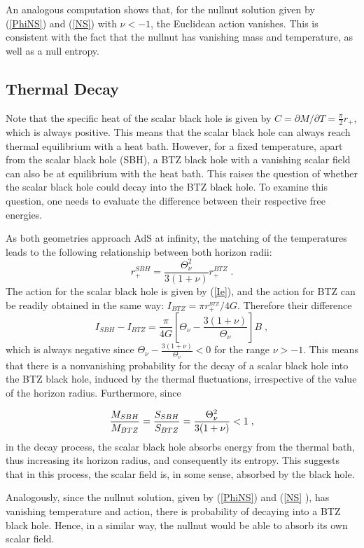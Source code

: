 \documentclass[a4paper,12pt]{article}
\begin{document}
An analogous computation shows that, for the nullnut solution given by (\ref{PhiNS})
and (\ref{NS})  with $\nu <-1$, the Euclidean action vanishes. This
is consistent with the fact that the nullnut has vanishing mass and
temperature, as well as a null entropy.

\subsection{Thermal Decay}

Note that the specific heat of the scalar black hole is given by $C=\partial
M/\partial T=\frac{\pi }{2}r_{+}$, which is always positive. This means that
the scalar black hole can always reach thermal equilibrium with a heat bath.
However, for a fixed temperature, apart from the scalar black hole (SBH), a
BTZ black hole with a vanishing scalar field can also be at equilibrium with
the heat bath. This raises the question of whether the scalar black
hole could decay into the BTZ black hole. To examine this question, one
needs to evaluate the difference between their respective free energies.

As both geometries approach AdS at infinity, the matching of the
temperatures leads to the following relationship between both horizon radii:
\[
r_{+}^{SBH}=\frac{\Theta _{\nu }^{2}}{3(1+\nu )}r_{+}^{BTZ}\;.
\]
The action for the scalar black hole is given by (\ref{Ie}), and the action
for BTZ can be readily obtained in the same way: $I_{BTZ}=\pi
r_{+}^{_{BTZ}}/{4G}$. Therefore their difference 
\[
I_{SBH}-I_{BTZ}=\frac{\pi }{4G}\left[ \Theta _{\nu }-\frac{3(1+\nu )}{\Theta
_{\nu }}\right] B\;,
\]
which is always negative since $\Theta _{\nu }-\frac{3(1+\nu )}{\Theta _{\nu
}}<0$ for the range $\nu >-1$. This means that there is a nonvanishing
probability for the decay of a scalar black hole into the BTZ black hole,
induced by the thermal fluctuations, irrespective of the value of the
horizon radius. Furthermore, since

\[
\frac{M_{SBH}}{M_{BTZ}}=\frac{S_{SBH}}{S_{BTZ}}=\frac{\Theta _{\nu }^{2}}{%
3(1+\nu )}<1\;,
\]
in the decay process, the scalar black hole absorbs energy from the thermal
bath, thus increasing its horizon radius, and consequently its entropy. This
suggests that in this process, the scalar field is, in some sense, absorbed
by the black hole.

Analogously, since the nullnut solution, given by (\ref{PhiNS}) and (\ref{NS}%
), has vanishing temperature and action, there is probability of decaying
into a BTZ black hole. Hence, in a similar way, the nullnut would be able to
absorb its own scalar field.
\end{document}
